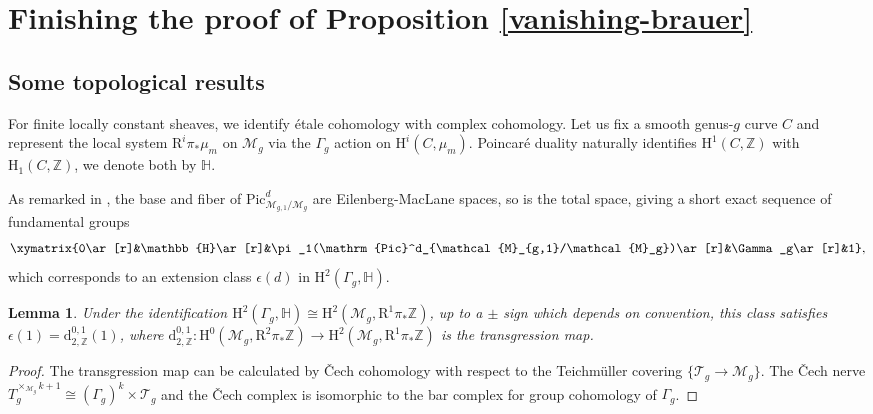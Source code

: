 \documentclass[12pt]{amsart}
\newtheorem{lemma}{Lemma}
\begin{document}
\section{Finishing the proof of Proposition \ref{vanishing-brauer}}\label{finish-proof}
\subsection{Some topological results}
For finite locally constant sheaves, we identify \'etale cohomology with complex cohomology. Let us fix a smooth genus-$g$ curve $C$ and represent the local system $\mathrm{R}^i\pi_*\mu_m$ on $\mathcal{M}_g$ via the $\Gamma_g$ action on $\mathrm{H}^i(C,\mu_m)$. Poincar\'e duality naturally identifies  $\mathrm{H}^1(C,\mathbb{Z})$ with  $\mathrm{H}_1(C,\mathbb{Z})$, we denote both by $\mathbb{H}$. 

As remarked in \cite[Corollary 22]{zbMATH01590471}, the base and fiber of $\mathrm{Pic}^d_{\mathcal{M}_{g,1}/\mathcal{M}_{g}}$ are Eilenberg-MacLane spaces, so is the total space, giving a short exact sequence of fundamental groups $$\xymatrix{0\ar[r]&\mathbb{H}\ar[r]&\pi_1(\mathrm{Pic}^d_{\mathcal{M}_{g,1}/\mathcal{M}_g})\ar[r]&\Gamma_g\ar[r]&1},$$ which corresponds to an extension class $\epsilon(d)$ in $\mathrm{H}^2(\Gamma_g,\mathbb{H})$. 

\begin{lemma}\label{identify}Under the identification $\mathrm{H}^2(\Gamma_g,\mathbb{H})\cong\mathrm{H}^2(\mathcal{M}_g,\mathrm{R}^1\pi_*\mathbb{Z})$, up to a $\pm$ sign which depends on convention, this class satisfies $\epsilon(1)=\mathrm{d}_{2,\mathbb{Z}}^{0,1}(1)$, where $\mathrm{d}_{2,\mathbb{Z}}^{0,1}\colon\mathrm{H}^0(\mathcal{M}_g,\mathrm{R}^2\pi_*\mathbb{Z})\to\mathrm{H}^2(\mathcal{M}_g,\mathrm{R}^1\pi_*\mathbb{Z})$ is the transgression map.
\end{lemma}
\begin{proof}The transgression map can be calculated by \v{C}ech cohomology with respect to the Teichm\"uller covering $\{\mathcal{T}_{g}\to\mathcal{M}_{g}\}$. The \v{C}ech nerve $T_{g}^{\times_{\mathcal{M}_g}k+1}\cong(\Gamma_g)^k\times\mathcal{T}_g$ and the \v{C}ech complex is isomorphic to the bar complex for group cohomology of $\Gamma_g$.
\end{proof}
\end{document}
